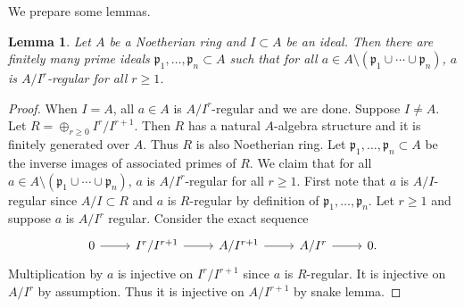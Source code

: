 \documentclass[12pt]{amsart}
\theoremstyle{plain}
\newtheorem{lemma}[theorem]{Lemma}
\theoremstyle{definition}
\numberwithin{equation}{section}
\def\p{{ \mathfrak{p}}}
\begin{document}
We prepare some lemmas.

\begin{lemma}\label{lem:quotreg}
Let $A$ be a Noetherian ring and $I \subset A$ be an ideal. 
Then there are finitely many prime ideals $\p_{1}, \dots, \p_{n} \subset A$
such that for all $a \in A \setminus (\p_{1} \cup \cdots \cup \p_{n}) $,
$a$ is $A/I^{r}$-regular for all $r \geq 1$.
\end{lemma}
\begin{proof}
When $I = A$, all $a \in A$ is $A/I^{r}$-regular and we are done.
Suppose $I \neq A$.
Let $R = \oplus_{r\geq 0} I^{r}/I^{r+1}$.
Then $R$ has a natural $A$-algebra structure and it is finitely generated over $A$.
Thus $R$ is also Noetherian ring.
Let $\p_{1}, \dots , \p_{n} \subset A$ be the inverse images of associated primes of $R$.
We claim that for all $a \in A \setminus (\p_{1} \cup \cdots \cup \p_{n}) $, $a$ is $A/I^{r}$-regular for all $r \geq 1$.
First note that $a$ is $A/I$-regular since $A/I \subset R$ and $a$ is $R$-regular by definition of $\p_{1}, \dots, \p_{n}$.
Let $r \geq 1$ and suppose $a$ is $A/I^{r}$ regular.
Consider the exact sequence
\begin{equation}
\begin{tikzcd}
0 \arrow[r] & I^{r}/I^{r+1} \arrow[r] & A/I^{r+1} \arrow[r] & A/I^{r} \arrow[r] & 0.
\end{tikzcd}
\end{equation}
Multiplication by $a$ is injective on $I^{r}/I^{r+1}$ since $a$ is $R$-regular.
It is injective on $A/I^{r}$ by assumption. Thus it is injective on $A/I^{r+1}$ by snake lemma.
\end{proof}
\end{document}
